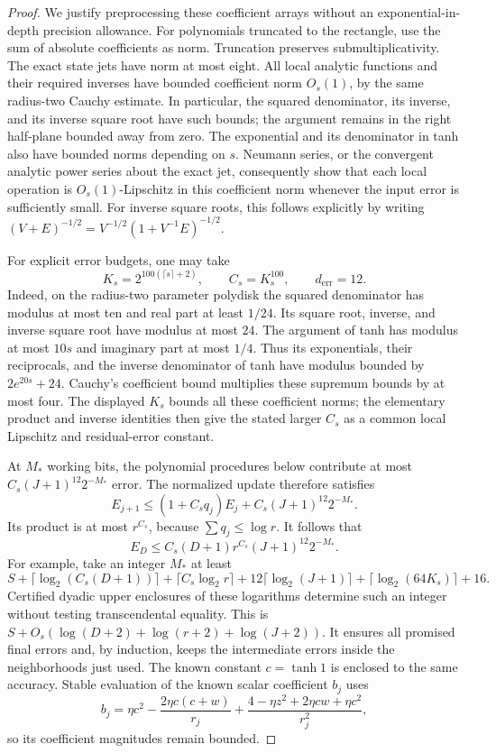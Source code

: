 \begin{proof}
We justify preprocessing these coefficient arrays without an
exponential-in-depth precision allowance. For polynomials
truncated to the rectangle, use the sum of absolute coefficients
as norm. Truncation preserves submultiplicativity. The exact
state jets have norm at most eight. All local analytic functions
and their required inverses have bounded coefficient norm
$O_s(1)$, by the same radius-two Cauchy estimate. In particular,
the squared denominator, its inverse, and its inverse square
root have such bounds; the argument remains in the right
half-plane bounded away from zero. The exponential and its
denominator in tanh also have bounded norms depending on $s$.
Neumann series, or the convergent analytic power series about
the exact jet, consequently show that each local operation is
$O_s(1)$-Lipschitz in this coefficient norm whenever the input
error is sufficiently small. For inverse square roots, this
follows explicitly by writing
$(V+E)^{-1/2}=V^{-1/2}(1+V^{-1}E)^{-1/2}$.

For explicit error budgets, one may take
\[
 K_s=2^{100(\lceil s\rceil+2)},\qquad C_s=K_s^{100},
 \qquad d_{\mathrm{err}}=12.
\]
Indeed, on the radius-two parameter polydisk the squared
denominator has modulus at most ten and real part at least
$1/24$. Its square root, inverse, and inverse square root
have modulus at most $24$. The argument of tanh has modulus
at most $10s$ and imaginary part at most $1/4$. Thus its
exponentials, their reciprocals, and the inverse denominator
of tanh have modulus bounded by $2e^{20s}+24$.
Cauchy's coefficient bound multiplies these supremum bounds
by at most four. The displayed $K_s$ bounds all these
coefficient norms; the elementary product and inverse
identities then give the stated larger $C_s$ as a common
local Lipschitz and residual-error constant.

At $M_*$ working bits, the polynomial procedures below
contribute at most $C_s(J+1)^{12}2^{-M_*}$ error.
The normalized update therefore
satisfies
\[
 E_{j+1}\le(1+C_sq_j)E_j+
                     C_s(J+1)^{12}2^{-M_*}.
\]
Its product is at most $r^{C_s}$, because $\sum q_j\le\log r$.
It follows that
\[
 E_D\le C_s(D+1)r^{C_s}(J+1)^{12}2^{-M_*}.
\]
For example, take an integer $M_*$ at least
\[
 S+\lceil\log_2(C_s(D+1))\rceil
   +\lceil C_s\log_2r\rceil
   +12\lceil\log_2(J+1)\rceil
   +\lceil\log_2(64K_s)\rceil+16.
\]
Certified dyadic upper enclosures of these logarithms determine
such an integer without testing transcendental equality.
This is $S+O_s(\log(D+2)+\log(r+2)+\log(J+2))$.
It ensures all promised final errors and, by induction, keeps the
intermediate errors inside the neighborhoods just used.
The known constant $c=\tanh1$ is enclosed to the same accuracy.
Stable evaluation of the known scalar coefficient $b_j$ uses
\[
 b_j=\eta c^2-\frac{2\eta c(c+w)}{r_j}
       +\frac{4-\eta z^2+2\eta cw+\eta c^2}{r_j^2},
\]
so its coefficient magnitudes remain bounded.


\end{proof}

